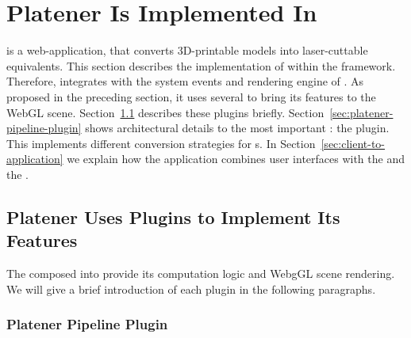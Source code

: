 \documentclass[../ClassicThesis.tex]{subfiles}
\begin{document}


\section{Platener Is Implemented In {\convertify}}
\label{sec:application-platener}


{\platener} is a web-application, that converts 3D-printable
models into laser-cuttable equivalents. This section
describes the implementation of {\platener} within the
{\convertify} framework. Therefore, {\platener} integrates
with the system events and rendering engine of
{\convertify}. As proposed in the preceding section, it uses
several  to bring its features to the WebGL
scene. Section~\ref{sec:platener-uses-plugins} describes
these plugins briefly.
Section~\ref{sec:platener-pipeline-plugin} shows
architectural details to the most important :
the  plugin. This 
implements different conversion strategies for
{\threedmodel}s. In Section~\ref{sec:client-to-application}
we explain how the application combines user interfaces with
the  and the .

\subsection{Platener Uses Plugins to Implement Its Features}
\label{sec:platener-uses-plugins}

The  composed into {\platener} provide its
computation logic and WebgGL scene rendering. We will give a
brief introduction of each plugin in the following
paragraphs.

\subsubsection{Platener Pipeline Plugin}

\end{document}
